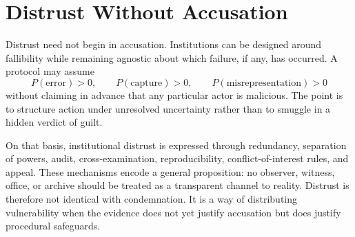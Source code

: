 
\chapter{Distrust Without Accusation}
\label{ch:ch005}


Distrust need not begin in accusation. Institutions can be designed around fallibility while remaining agnostic about which failure, if any, has occurred. A protocol may assume
\[
P(\text{error})>0,\qquad
P(\text{capture})>0,\qquad
P(\text{misrepresentation})>0
\]
without claiming in advance that any particular actor is malicious. The point is to structure action under unresolved uncertainty rather than to smuggle in a hidden verdict of guilt.

On that basis, institutional distrust is expressed through redundancy, separation of powers, audit, cross-examination, reproducibility, conflict-of-interest rules, and appeal. These mechanisms encode a general proposition: no observer, witness, office, or archive should be treated as a transparent channel to reality. Distrust is therefore not identical with condemnation. It is a way of distributing vulnerability when the evidence does not yet justify accusation but does justify procedural safeguards.
